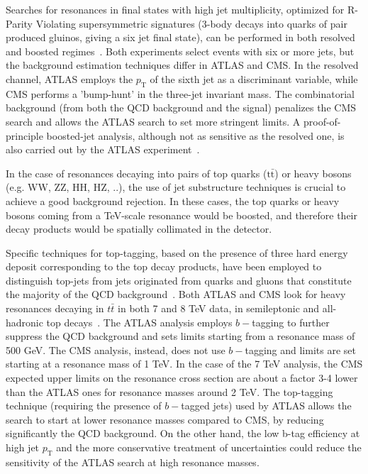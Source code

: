 \documentclass{PoS}
\begin{document}

Searches for resonances in final states with high jet multiplicity, optimized for R-Parity Violating supersymmetric 
signatures (3-body decays into quarks of pair produced gluinos, giving a six jet final state), 
can be performed in both resolved and boosted regimes~\cite{Chatrchyan2012329,SUSYRPVATLAS}.
Both experiments select events with six or more jets, but the background estimation techniques differ in
ATLAS and CMS. In the resolved channel, ATLAS employs the $p_\mathrm{T}$
of the sixth jet as a discriminant variable, while CMS performs a 'bump-hunt' in the 
three-jet invariant mass. The combinatorial background (from both the QCD background and the signal)
penalizes the CMS search and allows the ATLAS search to set more stringent limits. A proof-of-principle
boosted-jet analysis, although not as sensitive as the resolved one, is also carried out by the ATLAS experiment~\cite{SUSYRPVATLAS}. 
 
In the case of resonances decaying into pairs of top quarks ($\mbox{t}\bar{\mbox{t}}$) or heavy bosons (e.g. WW, ZZ, HH, HZ, ..), 
the use of jet substructure techniques is crucial to achieve a good background rejection. 
In these cases, the top quarks or heavy bosons coming from a TeV-scale resonance 
would be boosted, and therefore their decay products would be spatially collimated in the detector.  

Specific techniques for top-tagging, based on the presence of three hard energy deposit corresponding
to the top decay products, have been employed to distinguish top-jets from jets originated from quarks and gluons
that constitute the majority of the QCD background~\cite{Kaplan:2008ie, Plehn:2010st, ATLAS-CONF-2012-065, Almeida:2010pa}. 
Both ATLAS and CMS look for heavy resonances decaying in $t\bar{t}$ in both 7 and 8 TeV data, 
in semileptonic and all-hadronic top decays~\cite{TtbarResCMS, TtbarResATLAS, CMS-PAS-B2G-12-005, ATLAS-CONF-2013-052, CMS-PAS-B2G-12-006}.
The ATLAS analysis employs $b-$tagging to further suppress the QCD background and sets limits starting from a resonance mass of 500 GeV. 
The CMS analysis, instead, does not use $b-$tagging and limits are set starting at a resonance mass of 1 TeV. 
In the case of the 7 TeV analysis, the CMS expected upper limits on the resonance cross section are 
about a factor 3-4 lower than the ATLAS ones 
for resonance masses around 2 TeV.  The top-tagging technique (requiring the presence of $b-$tagged jets) used
by ATLAS allows the search to start at lower resonance masses 
compared to CMS, by reducing significantly the QCD background.
On the other hand, the low b-tag efficiency at high jet $ p_\mathrm{T}$ and the more conservative
treatment of uncertainties could reduce the sensitivity of the ATLAS search at high resonance masses.
\end{document}
